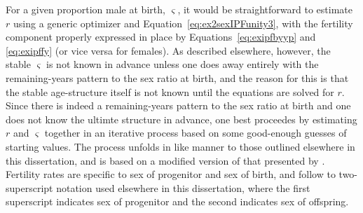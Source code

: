 \label{sec:rexIPFfindr}
For a given proportion male at birth, $\varsigma$, it would be straightforward
to estimate $r$ using a generic optimizer and
Equation~\eqref{eq:ex2sexIPFunity3}, with the fertility component properly
expressed in place by Equations~\eqref{eq:exipfbyyp} and \eqref{eq:exipffy} (or
vice versa for females). As described elsewhere, however, the stable $\varsigma$
is not known in advance unless one does away entirely with the remaining-years
pattern to the sex ratio at birth, and the reason for this is that the stable
age-structure itself is not known until the equations are solved for $r$.
Since there is indeed a remaining-years pattern to the sex ratio at birth and
one does not know the ultimte structure in advance, one best proceedes by
estimating $r$ and $\varsigma$ together in an iterative process based on some 
good-enough guesses of starting values. The process unfolds in like manner to 
those outlined elsewhere in this dissertation, and is based on a modified version 
of that presented by \citet{coale1957new}.
Fertility rates are specific to sex of progenitor and sex of birth, and follow
to two-superscript notation used elsewhere in this dissertation, where the first
superscript indicates sex of progenitor and the second indicates sex of
offspring.

